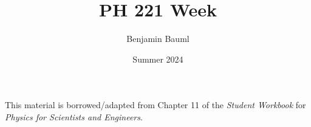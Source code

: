 \documentclass[]{article}
\title{PH 221 Week \Week}
\author{Benjamin Bauml}
\date{Summer 2024}
\newcommand{\FileDepth}{../../..}
\begin{document}
\maketitle
\begin{center}
	This material is borrowed/adapted from Chapter 11 of the \textit{Student Workbook} for \textit{Physics for Scientists and Engineers}.
\end{center}



\end{document}
